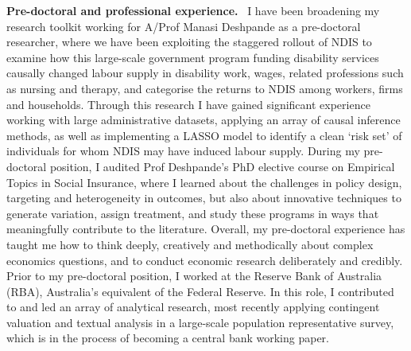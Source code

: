 \documentclass[11pt]{article}
\newcommand{\shead}[1]{\par\vspace{0.85em}\noindent\textbf{#1.}\ }
\begin{document}
\shead{Pre-doctoral and professional experience} I have been broadening my research toolkit working for A/Prof Manasi Deshpande as a pre-doctoral researcher, where we have been exploiting the staggered rollout of NDIS to examine how this large-scale government program funding disability services causally changed labour supply in disability work, wages, related professions such as nursing and therapy, and categorise the returns to NDIS among workers, firms and households. Through this research I have gained significant experience working with large administrative datasets, applying an array of causal inference methods, as well as implementing a LASSO model to identify a clean `risk set' of individuals for whom NDIS may have induced labour supply. During my pre-doctoral position, I audited Prof Deshpande's PhD elective course on Empirical Topics in Social Insurance, where I learned about the challenges in policy design, targeting and heterogeneity in outcomes, but also about innovative techniques to generate variation, assign treatment, and study these programs in ways that meaningfully contribute to the literature. Overall, my pre-doctoral experience has taught me how to think deeply, creatively and methodically about complex economics questions, and to conduct economic research deliberately and credibly. Prior to my pre-doctoral position, I worked at the Reserve Bank of Australia (RBA), Australia's equivalent of the Federal Reserve. In this role, I contributed to and led an array of analytical research, most recently applying contingent valuation and textual analysis in a large-scale population representative survey, which is in the process of becoming a central bank working paper.
\end{document}
